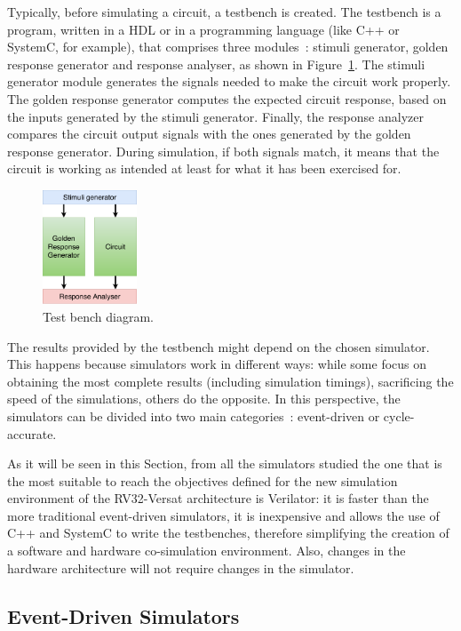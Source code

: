 \documentclass[conference]{IEEEtran}
\begin{document}
Typically, before simulating a circuit, a testbench is created. The testbench
is a program, written in a \ac{HDL} or in a programming language (like C++ or
SystemC, for example), that comprises three modules~\cite{tan:vhstas}: stimuli
generator, golden response generator and response analyser, as shown in
Figure~\ref{fig:tb}. The stimuli generator module generates the signals needed
to make the circuit work properly. The golden response generator computes the
expected circuit response, based on the inputs generated by the stimuli
generator. Finally, the response analyzer compares the circuit output signals
with the ones generated by the golden response generator. During simulation, if
both signals match, it means that the circuit is working as intended at least
for what it has been exercised for.

\begin{figure}[!htb]
	\centering
	\includegraphics[width=0.25\textwidth]{Figures/Testbench.pdf}
	\caption{Test bench diagram.}
	\label{fig:tb}
\end{figure}

The results provided by the testbench might depend on the chosen simulator. This
happens because simulators work in different ways: while some focus on obtaining
the most complete results (including simulation timings), sacrificing the speed
of the simulations, others do the opposite. In this perspective, the simulators
can be divided into two main categories~\cite{tan:vhstas,palnitkar:verilog}:
event-driven or cycle-accurate.

As it will be seen in this Section, from all the simulators studied the one that
is the most suitable to reach the objectives defined for the new simulation
environment of the RV32-Versat architecture is Verilator: it is faster than the
more traditional event-driven simulators, it is inexpensive and allows the use
of C++ and SystemC to write the testbenches, therefore simplifying the creation
of a software and hardware co-simulation environment. Also, changes in the
hardware architecture will not require changes in the simulator.

\subsection{Event-Driven Simulators}
\label{section:event}
\end{document}
